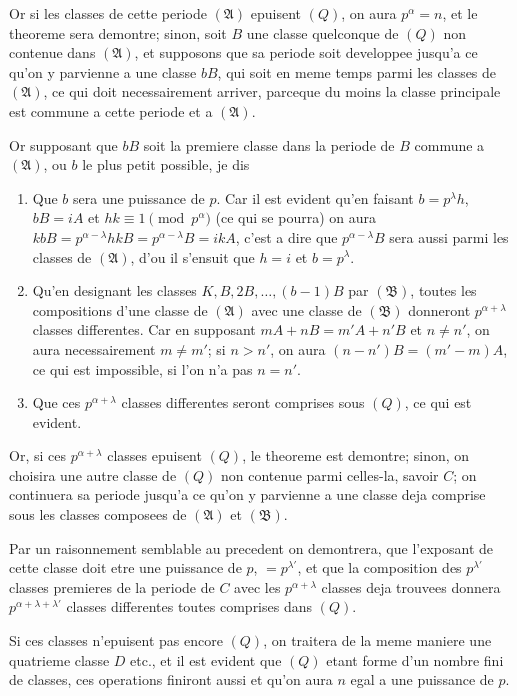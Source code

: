 \documentclass[12pt,a4paper]{article}
\begin{document}
Or si les classes de cette periode $(\mathfrak{A})$ epuisent $(Q)$, on aura $p^\alpha=n$, et le theoreme sera demontre; sinon, soit $B$ une classe quelconque de $(Q)$ non contenue dans $(\mathfrak{A})$, et supposons que sa periode soit developpee jusqu'a ce qu'on y parvienne a une classe $bB$, qui soit en meme temps parmi les classes de $(\mathfrak{A})$, ce qui doit necessairement arriver, parceque du moins la classe principale est commune a cette periode et a $(\mathfrak{A})$.

Or supposant que $bB$ soit la premiere classe dans la periode de $B$ commune a $(\mathfrak{A})$, ou $b$ le plus petit possible, je dis
\begin{enumerate}
\item Que $b$ sera une puissance de $p$. Car il est evident qu'en faisant $b=p^\lambda h$, $bB=iA$ et $hk\equiv 1 \pmod{p^\alpha}$ (ce qui se pourra) on aura $kbB=p^{\alpha-\lambda}hkB=p^{\alpha-\lambda}B=ikA$, c'est a dire que $p^{\alpha-\lambda}B$ sera aussi parmi les classes de $(\mathfrak{A})$, d'ou il s'ensuit que $h=i$ et $b=p^\lambda$.
\item Qu'en designant les classes $K, B, 2B, \ldots, (b-1)B$ par $(\mathfrak{B})$, toutes les compositions d'une classe de $(\mathfrak{A})$ avec une classe de $(\mathfrak{B})$ donneront $p^{\alpha+\lambda}$ classes differentes. Car en supposant $mA+nB=m'A+n'B$ et $n\neq n'$, on aura necessairement $m\neq m'$; si $n>n'$, on aura $(n-n')B=(m'-m)A$, ce qui est impossible, si l'on n'a pas $n=n'$.
\item Que ces $p^{\alpha+\lambda}$ classes differentes seront comprises sous $(Q)$, ce qui est evident.
\end{enumerate}

Or, si ces $p^{\alpha+\lambda}$ classes epuisent $(Q)$, le theoreme est demontre; sinon, on choisira une autre classe de $(Q)$ non contenue parmi celles-la, savoir $C$; on continuera sa periode jusqu'a ce qu'on y parvienne a une classe deja comprise sous les classes composees de $(\mathfrak{A})$ et $(\mathfrak{B})$.

Par un raisonnement semblable au precedent on demontrera, que l'exposant de cette classe doit etre une puissance de $p$, $=p^{\lambda'}$, et que la composition des $p^{\lambda'}$ classes premieres de la periode de $C$ avec les $p^{\alpha+\lambda}$ classes deja trouvees donnera $p^{\alpha+\lambda+\lambda'}$ classes differentes toutes comprises dans $(Q)$.

Si ces classes n'epuisent pas encore $(Q)$, on traitera de la meme maniere une quatrieme classe $D$ etc., et il est evident que $(Q)$ etant forme d'un nombre fini de classes, ces operations finiront aussi et qu'on aura $n$ egal a une puissance de $p$.
\end{document}
